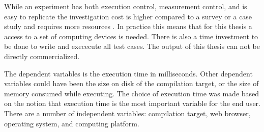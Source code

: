 
While an experiment has both execution control, measurement control, and is easy to replicate the investigation cost is higher compared to a survey or a case study and requires more resources \parencite{WohlinRunesonHostOhlssonRegnellWesslen2012}. In practice this means that for this thesis a access to a set of computing devices is needed. There is also a time investment to be done to write and exececute all test cases. The output of this thesis can not be directly commercialized.

The dependent variables is the execution time in milliseconds. Other dependent variables could have been the size on disk of the compilation target, or the size of memory consumed while executing. The choice of execution time was made based on the notion that execution time is the most important variable for the end user. There are a number of independent variables: compilation target, web browser, operating system, and computing platform.




